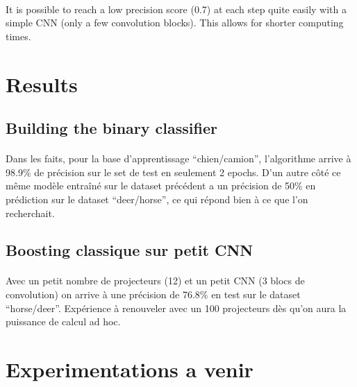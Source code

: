 \documentclass[11 pt]{article}
\begin{document}
\paragraph{}It is possible to reach a low precision score (0.7) at each step quite easily with a simple CNN (only a few convolution blocks). This allows for shorter computing times. 


\section{Results}

\subsection{Building the binary classifier}

\paragraph{}Dans les faits, pour la base d’apprentissage “chien/camion”, l’algorithme arrive à 98.9\% de précision sur le set de test en seulement 2 epochs. D’un autre côté ce même modèle entraîné sur le dataset précédent a un précision de 50\% en prédiction sur le dataset “deer/horse”, ce qui répond bien à ce que l’on recherchait.


\subsection{Boosting classique sur petit CNN}
\paragraph{}Avec un petit nombre de projecteurs (12) et un petit CNN (3 blocs de convolution) on arrive à une précision de 76.8\% en test sur le dataset “horse/deer”. Expérience à renouveler avec un 100 projecteurs dès qu’on aura la puissance de calcul ad hoc.

\section{Experimentations a venir}
\end{document}
